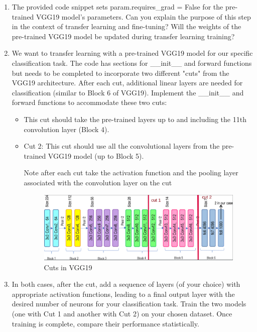 \documentclass[11pt]{scrartcl}
\begin{document}
\begin{enumerate}
    \item The provided code snippet sets param.requires\_grad = False 
	for the pre-trained VGG19 model's parameters. 
	Can you explain the purpose of this step in the context of transfer learning and fine-tuning? 
	Will the weights of the pre-trained VGG19 model be updated during transfer learning training?

    \item We want to transfer learning with a pre-trained VGG19 model 
	for our specific classification task. The code has sections for \_\_init\_\_ 
	and forward functions but needs to be completed to incorporate two different "cuts" 
	from the VGG19 architecture. 
	After each cut, additional linear layers are needed for classification 
	(similar to Block 6 of VGG19).
	Implement the \_\_init\_\_ and forward functions to accommodate these two cuts:

	\begin{itemize}
		\item This cut should take the pre-trained layers up to 
		and including the 11th convolution layer (Block 4).

		\item Cut 2: This cut should use all the convolutional layers 
		from the pre-trained VGG19 model (up to Block 5).
		
		Note after each cut take the activation function and the pooling layer 
		associated with the convolution layer on the cut

		\begin{figure}[th]
			\centering
			\includegraphics[scale=0.33]{cuts.png}
			\caption{Cuts in VGG19}
			\label{fig:model-vgg19}
		\end{figure}
	\end{itemize}

	\item In both cases, after the cut, add a sequence of layers (of your choice) 
	with appropriate activation functions, leading to a final output layer 
	with the desired number of neurons for your classification task.
	Train the two models (one with Cut 1 and another with Cut 2) on your chosen dataset. 
	Once training is complete, compare their performance statistically.


\end{enumerate}
\end{document}
